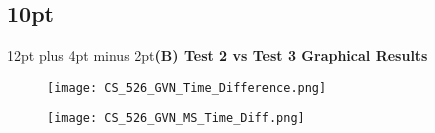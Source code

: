 \documentclass[onecolumn,10pt]{journal}
\begin{document}
\pagebreak

\titlespacing\subsection*{10pt}{12pt plus 4pt minus 2pt}\textbf{(B) Test 2 vs Test 3 Graphical Results }

\begin{figure}[h] 
\centering
\texttt{[image: CS\_526\_GVN\_Time\_Difference.png]}
\caption{}
\end{figure}

\begin{figure}[h] 
\centering
\texttt{[image: CS\_526\_GVN\_MS\_Time\_Diff.png]}
\caption{}
\end{figure}

\pagebreak
\end{document}
